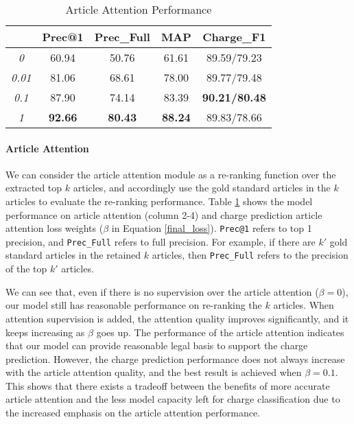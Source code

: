 \begin{table}
\centering
\normalsize{
\begin{tabular}{|c|c|c|c|c|}
\hline
\bm{$\beta$}			& \textbf{Prec@1} 			& \textbf{Prec\_Full} 			& \textbf{MAP} 			& \textbf{Charge\_F1} \\
\hline
\textit{0} 								& 60.94									& 50.76  									& 61.61 						& 89.59/79.23 	\\
\hline
\textit{0.01} 						& 81.06									& 68.61  									& 78.00							& 89.77/79.48 	\\
\hline
\textit{0.1} 							& 87.90									& 74.14  									& 83.39							& \textbf{90.21/80.48} 	\\
\hline
\textit{1} 								& \textbf{92.66}				& \textbf{80.43}  				& \textbf{88.24}		& 89.83/78.66 	\\
\hline
\end{tabular}
}
\caption{Article Attention Performance}
\label{tab_article_att}
\end{table}


\paragraph{Article Attention}
We can consider the article attention module as a re-ranking function over the extracted top $k$ articles, and accordingly use the gold standard articles in the $k$ articles to evaluate the re-ranking performance. Table \ref{tab_article_att} shows the model performance on article attention (column 2-4) and charge prediction  article attention loss weights ($\beta$ in Equation \ref{final_loss}). \texttt{Prec@1} refers to top 1 precision, and \texttt{Prec\_Full} refers to full precision. For example, if there are $k'$ gold standard articles in the retained $k$ articles, then \texttt{Prec\_Full} refers to the precision of the top $k'$ articles.

We can see that, even if there is no supervision over the article attention ($\beta=0$), our model still has reasonable performance on re-ranking the $k$ articles. When attention supervision is added, the attention quality improves significantly, and it keeps increasing as $\beta$ goes up.
The  performance of the article attention indicates that our model can provide reasonable legal basis to support the charge prediction.
However, the charge prediction performance does not always increase with the article attention quality, and the best result is achieved when $\beta=0.1$. This shows that there exists a tradeoff between the benefits of more accurate article attention and the less model capacity left for charge classification due to the increased emphasis on the article attention performance.

